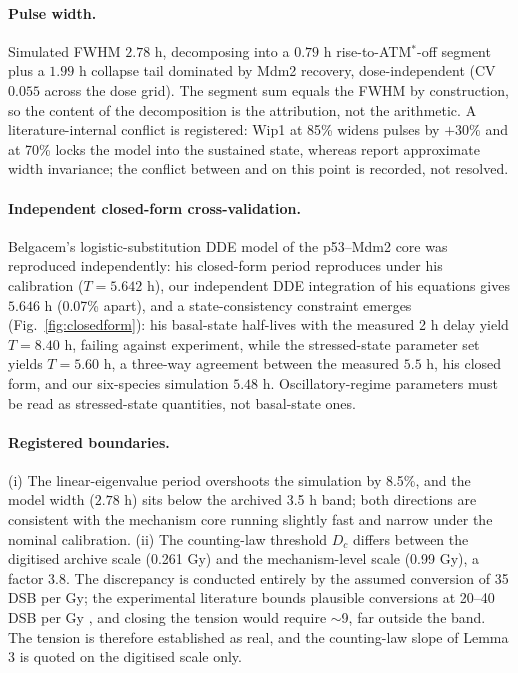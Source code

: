\documentclass[11pt,a4paper]{article}
\begin{document}
\paragraph{Pulse width.} Simulated FWHM $2.78$ h, decomposing into a $0.79$ h rise-to-ATM$^*$-off segment plus a $1.99$ h collapse tail dominated by Mdm2 recovery, dose-independent (CV $0.055$ across the dose grid). The segment sum equals the FWHM by construction, so the content of the decomposition is the attribution, not the arithmetic. A literature-internal conflict is registered: Wip1 at 85\% widens pulses by $+30\%$ and at 70\% locks the model into the sustained state, whereas \cite{Monke2017} report approximate width invariance; the conflict between \cite{Batchelor2011} and \cite{Monke2017} on this point is recorded, not resolved.

\paragraph{Independent closed-form cross-validation.} Belgacem's logistic-substitution DDE model of the p53--Mdm2 core \cite{Belgacem2026} was reproduced independently: his closed-form period reproduces under his calibration ($T=5.642$ h), our independent DDE integration of his equations gives $5.646$ h (0.07\% apart), and a state-consistency constraint emerges (Fig.~\ref{fig:closedform}): his basal-state half-lives with the measured 2 h delay yield $T=8.40$ h, failing against experiment, while the stressed-state parameter set yields $T=5.60$ h, a three-way agreement between the measured $5.5$ h, his closed form, and our six-species simulation $5.48$ h. Oscillatory-regime parameters must be read as stressed-state quantities, not basal-state ones.

\paragraph{Registered boundaries.} (i) The linear-eigenvalue period overshoots the simulation by 8.5\%, and the model width ($2.78$ h) sits below the archived 3.5 h band; both directions are consistent with the mechanism core running slightly fast and narrow under the nominal calibration. (ii) The counting-law threshold $D_c$ differs between the digitised archive scale (0.261 Gy) and the mechanism-level scale (0.99 Gy), a factor $3.8$. The discrepancy is conducted entirely by the assumed conversion of 35 DSB per Gy; the experimental literature bounds plausible conversions at 20--40 DSB per Gy \cite{Rothkamm2003}, and closing the tension would require $\sim$9, far outside the band. The tension is therefore established as real, and the counting-law slope of Lemma 3 is quoted on the digitised scale only.
\end{document}
